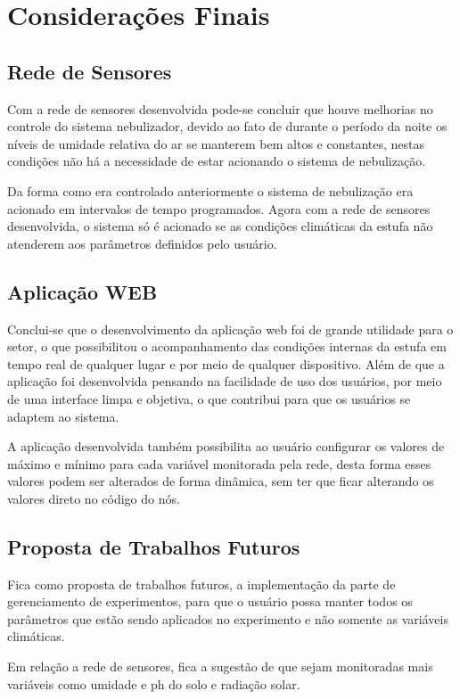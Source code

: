 \chapter{Considerações Finais}

\section{Rede de Sensores}
Com a rede de sensores desenvolvida pode-se concluir que houve melhorias no controle do sistema nebulizador, devido ao fato de durante o período da noite os níveis de umidade relativa do ar se manterem bem altos e constantes, nestas condições não há a necessidade de estar acionando o sistema de nebulização. 

Da forma como era controlado anteriormente o sistema de nebulização era acionado em intervalos de tempo programados. Agora com a rede de sensores desenvolvida, o sistema só é acionado se as condições climáticas da estufa não atenderem aos parâmetros definidos pelo usuário.

\section{Aplicação WEB}
Conclui-se que o desenvolvimento da aplicação web foi de grande utilidade para o setor, o que possibilitou o acompanhamento das condições internas da estufa em tempo real de qualquer lugar e por meio de qualquer dispositivo. Além de que a aplicação foi desenvolvida pensando na facilidade de uso dos usuários, por meio de uma interface limpa e objetiva, o que contribui para que os usuários se adaptem ao sistema.	

A aplicação desenvolvida também possibilita ao usuário configurar os valores de máximo e mínimo para cada variável monitorada pela rede, desta forma esses valores podem ser alterados de forma dinâmica, sem ter que ficar alterando os valores direto no código do nós.

\section{Proposta de Trabalhos Futuros}
Fica como proposta de trabalhos futuros, a implementação da parte de gerenciamento de experimentos, para que o usuário possa manter todos os parâmetros que estão sendo aplicados no experimento e não somente as variáveis climáticas.

Em relação a rede de sensores, fica a sugestão de que sejam monitoradas mais variáveis como umidade e ph do solo e radiação solar.